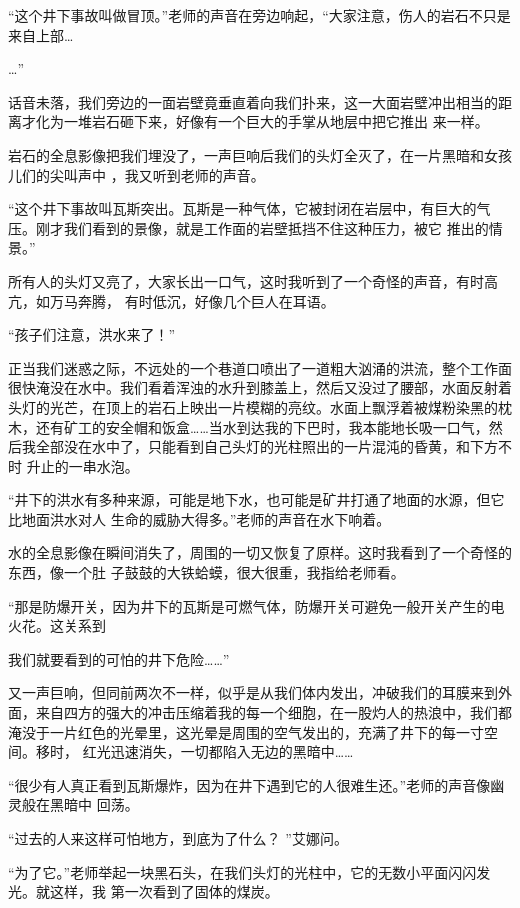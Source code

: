 \documentclass{article}
\begin{document}
“这个井下事故叫做冒顶。”老师的声音在旁边响起，“大家注意，伤人的岩石不只是来自上部…

\newpage
…” 

话音未落，我们旁边的一面岩壁竟垂直着向我们扑来，这一大面岩壁冲出相当的距离才化为一堆岩石砸下来，好像有一个巨大的手掌从地层中把它推出
来一样。 

岩石的全息影像把我们埋没了，一声巨响后我们的头灯全灭了，在一片黑暗和女孩儿们的尖叫声中
，我又听到老师的声音。 

“这个井下事故叫瓦斯突出。瓦斯是一种气体，它被封闭在岩层中，有巨大的气压。刚才我们看到的景像，就是工作面的岩壁抵挡不住这种压力，被它
推出的情景。” 

所有人的头灯又亮了，大家长出一口气，这时我听到了一个奇怪的声音，有时高亢，如万马奔腾，
有时低沉，好像几个巨人在耳语。 


“孩子们注意，洪水来了！” 

\newpage

正当我们迷惑之际，不远处的一个巷道口喷出了一道粗大汹涌的洪流，整个工作面很快淹没在水中。我们看着浑浊的水升到膝盖上，然后又没过了腰部，水面反射着头灯的光芒，在顶上的岩石上映出一片模糊的亮纹。水面上飘浮着被煤粉染黑的枕木，还有矿工的安全帽和饭盒……当水到达我的下巴时，我本能地长吸一口气，然后我全部没在水中了，只能看到自己头灯的光柱照出的一片混沌的昏黄，和下方不时
升止的一串水泡。 

“井下的洪水有多种来源，可能是地下水，也可能是矿井打通了地面的水源，但它比地面洪水对人
生命的威胁大得多。”老师的声音在水下响着。 

水的全息影像在瞬间消失了，周围的一切又恢复了原样。这时我看到了一个奇怪的东西，像一个肚
子鼓鼓的大铁蛤蟆，很大很重，我指给老师看。 

“那是防爆开关，因为井下的瓦斯是可燃气体，防爆开关可避免一般开关产生的电火花。这关系到

\newpage
我们就要看到的可怕的井下危险……” 

又一声巨响，但同前两次不一样，似乎是从我们体内发出，冲破我们的耳膜来到外面，来自四方的强大的冲击压缩着我的每一个细胞，在一股灼人的热浪中，我们都淹没于一片红色的光晕里，这光晕是周围的空气发出的，充满了井下的每一寸空间。移时，
红光迅速消失，一切都陷入无边的黑暗中…… 

“很少有人真正看到瓦斯爆炸，因为在井下遇到它的人很难生还。”老师的声音像幽灵般在黑暗中
回荡。 

“过去的人来这样可怕地方，到底为了什么？
”艾娜问。 

“为了它。”老师举起一块黑石头，在我们头灯的光柱中，它的无数小平面闪闪发光。就这样，我
第一次看到了固体的煤炭。 
\end{document}

